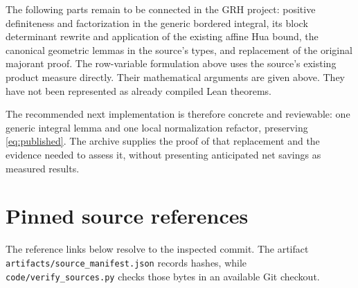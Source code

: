 \documentclass[11pt,letterpaper]{article}
\theoremstyle{remark}
\newcommand{\code}[1]{{\small\urlstyle{tt}\nolinkurl{#1}}}
\begin{document}
The following parts remain to be connected in the GRH project: positive
definiteness and factorization in the generic bordered integral, its block
determinant rewrite and application of the existing affine Hua bound, the
canonical geometric lemmas in the source's types, and replacement of the
original majorant proof. The row-variable formulation above uses the source's
existing product measure directly. Their mathematical
arguments are given above. They have not been represented as already compiled
Lean theorems.

The recommended next implementation is therefore concrete and reviewable:
one generic integral lemma and one local normalization refactor, preserving
\eqref{eq:published}. The archive supplies the proof of that replacement and
the evidence needed to assess it, without presenting anticipated net savings
as measured results.

\appendix
\section{Pinned source references}

The reference links below resolve to the inspected commit. The artifact
\code{artifacts/source_manifest.json} records hashes, while
\code{code/verify_sources.py} checks those bytes in an available Git checkout.
\end{document}
